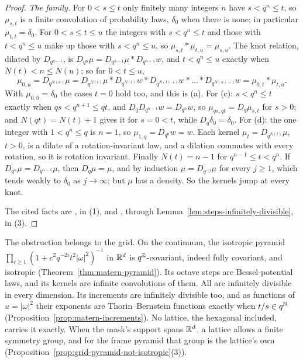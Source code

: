 \begin{proof}
\emph{The family.} For $0 < s \le t$ only finitely many integers $n$ have $s < q^n \le t$, so
$\mu_{s,t}$ is a finite convolution of probability laws, $\delta_0$ when there is none; in
particular $\mu_{t,t} = \delta_0$. For $0 < s \le t \le u$ the integers with $s < q^n \le t$ and
those with $t < q^n \le u$ make up those with $s < q^n \le u$, so
$\mu_{s,t} * \mu_{t,u} = \mu_{s,u}$. The knot relation, dilated by $D_{q^{n-1}}$, is
$D_{q^n}\mu = D_{q^{n-1}}\mu * D_{q^{n-1}}w$, and $t < q^n \le u$ exactly when
$N(t) < n \le N(u)$; so for $0 < t \le u$,
\[
  \mu_{0,u} = D_{q^{N(u)}}\mu
  = D_{q^{N(t)}}\mu * D_{q^{N(t)}}w * D_{q^{N(t)+1}}w * \dots * D_{q^{N(u)-1}}w
  = \mu_{0,t} * \mu_{t,u} .
\]
With $\mu_{0,0} = \delta_0$ the cases $t = 0$ hold too, and this is (a).
For (c): $s < q^n \le t$ exactly when $qs < q^{n+1} \le qt$, and
$D_qD_{q^{n-1}}w = D_{q^n}w$, so $\mu_{qs,qt} = D_q\mu_{s,t}$ for $s > 0$; and $N(qt) = N(t) + 1$
gives it for $s = 0 < t$, while $D_q\delta_0 = \delta_0$. For (d): the one integer with
$1 < q^n \le q$ is $n = 1$, so $\mu_{1,q} = D_{q^0}w = w$. Each kernel $\mu_t = D_{q^{N(t)}}\mu$,
$t > 0$, is a dilate of a rotation-invariant law, and a dilation commutes with every rotation, so
it is rotation invariant. Finally $N(t) = n - 1$ for $q^{n-1} \le t < q^n$. If
$D_{q^n}\mu = D_{q^{n-1}}\mu$, then $D_q\mu = \mu$, and by induction $\mu = D_{q^{-j}}\mu$ for every
$j \ge 1$, which tends weakly to $\delta_0$ as $j \to \infty$; but $\mu$ has a density. So the
kernels jump at every knot.

The cited facts are , in (1), and , through
Lemma~\ref{lem:steps-infinitely-divisible}, in (3).
\end{proof}

The obstruction belongs to the grid. On the continuum, the isotropic \Matern{} pyramid
$\prod_{i \ge 1}(1 + c^2q^{-2i}t^2|\omega|^2)^{-1}$ in $\mathbb{R}^d$ is $q^{\mathbb{Z}}$-covariant, indeed fully
covariant, and isotropic (Theorem~\ref{thm:matern-pyramid}). Its octave steps are
Bessel-potential laws, and its kernels are infinite convolutions of them. All are infinitely
divisible in every dimension. Its increments are infinitely
divisible too, and as functions of $u = |\omega|^2$ their exponents are Thorin--Bernstein functions
exactly when $t/s \in q^{\mathbb{N}}$ (Proposition~\ref{prop:matern-increments}). No lattice, the
hexagonal included, carries it exactly. When the mask's support spans $\mathbb{R}^d$, a lattice allows a
finite symmetry group, and for the frame \Matern{} pyramid that group is the lattice's own
(Proposition~\ref{prop:grid-pyramid-not-isotropic}(3)).

